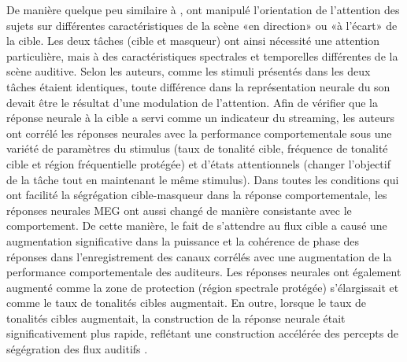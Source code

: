 De manière quelque peu similaire à \cite{elhilali2009interaction}, \cite{akram2014investigating} ont manipulé l'orientation de l'attention des sujets sur différentes caractéristiques de la scène «en direction» ou «à l'écart» de la cible. 
Les deux tâches (cible et masqueur) ont ainsi nécessité une attention particulière, mais à des caractéristiques spectrales et temporelles différentes de la scène auditive. 
Selon les auteurs, comme les stimuli présentés dans les deux tâches étaient identiques, toute différence dans la représentation neurale du son devait être le résultat d'une modulation de l'attention. 
Afin de vérifier que la réponse neurale à la cible a servi comme un indicateur du streaming, les auteurs ont corrélé les réponses neurales avec la performance comportementale sous une variété de paramètres du stimulus (taux de tonalité cible, fréquence de tonalité cible et région fréquentielle protégée) et d'états attentionnels (changer l'objectif de la tâche tout en maintenant le même stimulus). 
Dans toutes les conditions qui ont facilité la ségrégation cible-masqueur dans la réponse comportementale, les réponses neurales MEG ont aussi changé de manière consistante avec le comportement. 
De cette manière, le fait de s'attendre au flux cible a causé une augmentation significative dans la puissance et la cohérence de phase des réponses dans l'enregistrement des canaux corrélés avec une augmentation de la performance comportementale des auditeurs. 
Les réponses neurales ont également augmenté comme la zone de protection (région spectrale protégée) s'élargissait et comme le taux de tonalités cibles augmentait. 
En outre, lorsque le taux de tonalités cibles augmentait, la construction de la réponse neurale était significativement plus rapide, reflétant une construction accélérée des percepts de ségégration des flux auditifs \citep{elhilali2009interaction}. 

